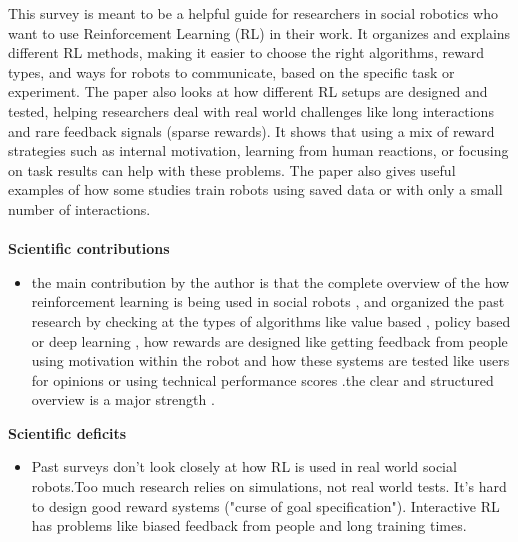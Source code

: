 \documentclass[report.tex]{subfiles}
\begin{document}
This survey is meant to be a helpful guide for researchers in social robotics who want to use Reinforcement Learning (RL) in their work. It organizes and explains different RL methods, making it easier to choose the right algorithms, reward types, and ways for robots to communicate, based on the specific task or experiment. The paper also looks at how different RL setups are designed and tested, helping researchers deal with real world challenges like long interactions and rare feedback signals (sparse rewards). It shows that using a mix of reward strategies such as internal motivation, learning from human reactions, or focusing on task results can help with these problems. The paper also gives useful examples of how some studies train robots using saved data or with only a small number of interactions.\\\\



\noindent\textbf{Scientific contributions} 
\begin{itemize}
        \item the main contribution by the author is that the complete overview of the how reinforcement learning is being used in social  robots , and organized the past research by checking at the types of algorithms like value based , policy based or deep learning , how rewards are designed like getting feedback from people  using motivation within the robot  and how these systems are tested  like users for opinions or using technical performance scores .the clear and structured overview is a major strength . 
        
\end{itemize}

\noindent\textbf{Scientific deficits} 
\begin{itemize}
        \item Past surveys don’t look closely at how RL is used in real world social robots.Too much research relies on simulations, not real world tests. It's hard to design good reward systems ("curse of goal specification"). Interactive RL has problems like biased feedback from people and long training times.
        
       
\end{itemize}
\end{document}
